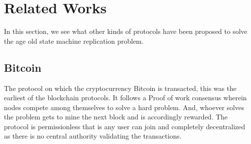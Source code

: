 
\chapter{Related Works} %

\label{Chapter 7} %


In this section, we see what other kinds of protocols have been proposed to solve the age old state machine replication problem.

\section{Bitcoin}

The protocol on which the cryptocurrency Bitcoin is transacted, this was the earliest of the blockchain protocols. It follows a Proof of work consensus wherein nodes compete among themselves to solve a hard problem. And, whoever solves the problem gets to mine the next block and is accordingly rewarded. The protocol is permissionless that is any user can join and completely decentralized as there is no central authority validating the transactions.

